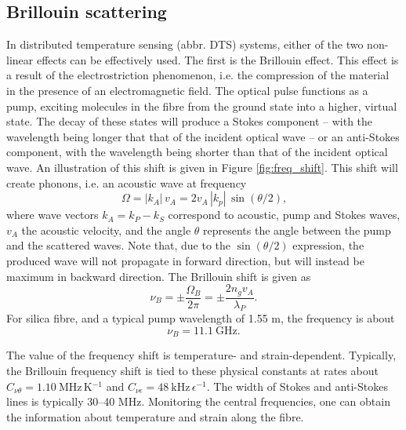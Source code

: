 \documentclass{standalone}
\begin{document}
\subsection{Brillouin scattering}

In distributed temperature sensing (abbr. DTS) systems, either of the two non-linear effects can be effectively used. The first is the Brillouin effect. This effect is a result of the electrostriction phenomenon, i.e. the compression of the material in the presence of an electromagnetic field. The optical pulse functions as a pump, exciting molecules in the fibre from the ground state into a higher, virtual state. The decay of these states will produce a Stokes component -- with the wavelength being longer that that of the incident optical wave -- or an anti-Stokes component, with the wavelength being shorter than that of the incident optical wave. An illustration of this shift is given in Figure \ref{fig:freq_shift}. 
This shift will create phonons, i.e. an acoustic wave at frequency
\begin{equation}
\Omega = \left|k_A\right| \, v_A = 2 v_A \, \left|k_p\right| \, \sin\left(\theta / 2 \right) \textrm{,}
\end{equation}
where wave vectors $k_A = k_P - k_S$ correspond to acoustic, pump and Stokes waves, $v_A$ the acoustic velocity, and the angle $\theta$ represents the angle between the pump and the scattered waves. Note that, due to the $\sin\left(\theta / 2\right)$ expression, the produced wave will not propagate in forward direction, but will instead be maximum in backward direction. The Brillouin shift is given as
\begin{equation}
\nu_B = \pm \frac{\Omega_B}{2 \pi} = \pm \frac{2 n_g v_A}{\lambda_P} \textrm{.}
\end{equation}
For silica fibre, and a typical pump wavelength of 1.55 \textmu m, the frequency is about 
\begin{equation}
\nu_B = \SI{11.1}{\giga \hertz} \textrm{.}
\end{equation}

The value of the frequency shift is temperature- and strain-dependent. Typically, the Brillouin frequency shift is tied to these physical constants at rates about $C_{\nu\theta} = \SI{1.10}{\mega \hertz \, \kelvin^{-1}}$ and $C_{\nu\epsilon} = \SI{48}{\kilo \hertz \, \epsilon^{-1}}$. The width of Stokes and anti-Stokes lines is typically 30--40 MHz. Monitoring the central frequencies, one can obtain the information about temperature and strain along the fibre. \\
\end{document}
